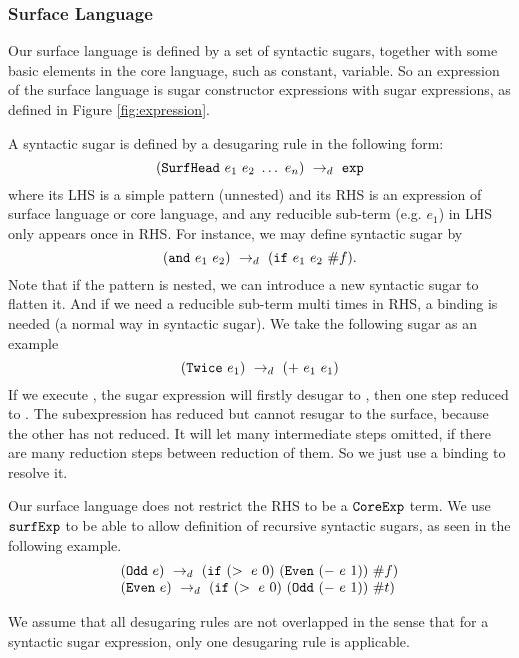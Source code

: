 
\subsubsection{Surface Language}

Our surface language is defined by a set of syntactic sugars, together with some basic elements in the core language, such as constant, variable. So an expression of the surface language is sugar constructor expressions with sugar expressions, as defined in Figure \ref{fig:expression}.

A syntactic sugar is defined by a desugaring rule in the following form:
\[
(\mbox{\tt SurfHead}~e_1~e_2~\ldots~e_n) ~\rightarrow_d~ \mbox{\tt exp}
\]
where its LHS is a simple pattern (unnested) and its RHS is an expression of surface language or core language, and any reducible sub-term (e.g. $e_1$) in LHS only appears once in RHS. For instance, we may define syntactic sugar  by
\[
(\mbox{\tt and}~e_1~e_2) ~\rightarrow_d~ (\mbox{\tt if}~e_1~e_2~\#f).
\]
Note that if the pattern is nested, we can introduce a new syntactic sugar to flatten it. And if we need a reducible sub-term multi times in RHS, a  binding is needed (a normal way in syntactic sugar). We take the following sugar as an example
\[(\mbox{\tt Twice}~e_1) ~\rightarrow_d~ (+~e_1~e_1)\]
If we execute , the sugar expression will firstly desugar to , then one step reduced to . The subexpression  has reduced but cannot resugar to the surface, because the other  has not reduced. It will let many intermediate steps omitted, if there are many reduction steps between reduction of them. So we just use a  binding to resolve it.

Our surface language does not restrict the RHS to be a $\mbox{\tt CoreExp}$ term. We use $\mbox{\tt surfExp}$ to be able to allow definition of recursive syntactic sugars, as seen in the following example.
\[
\begin{array}{l}
(\mbox{\tt Odd}~e) ~\rightarrow_d~ (\mbox{\tt if}~(>~e~0)~(\mbox{\tt Even}~(-~e~1))~\#f)\\
(\mbox{\tt Even}~e) ~\rightarrow_d~ (\mbox{\tt if}~(>~e~0)~(\mbox{\tt Odd}~(-~e~1))~\#t)
\end{array}
\]

We assume that all desugaring rules are not overlapped in the sense that for a syntactic sugar expression, only one desugaring rule is applicable. 


